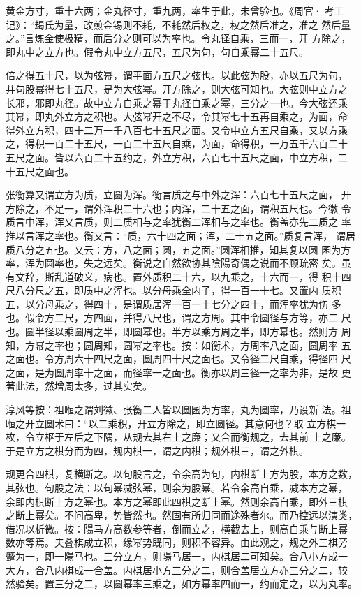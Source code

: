 \documentclass[a4paper,12pt,UTF8,twoside]{ctexbook}
\begin{document}
黄金方寸，重十六两；金丸径寸，重九两，率生于此，未曾验也。《周官· 考工记》：“朅氏为量，改煎金锡则不耗，不耗然后权之，权之然后准之，准之 然后量之。”言炼金使极精，而后分之则可以为率也。令丸径自乘，三而一，开 方除之，即丸中之立方也。假令丸中立方五尺，五尺为句，句自乘幂二十五尺。

倍之得五十尺，以为弦幂，谓平面方五尺之弦也。以此弦为股，亦以五尺为句， 并句股幂得七十五尺，是为大弦幂。开方除之，则大弦可知也。大弦则中立方之 长邪，邪即丸径。故中立方自乘之幂于丸径自乘之幂，三分之一也。今大弦还乘 其幂，即丸外立方之积也。大弦幂开之不尽，令其幂七十五再自乘之，为面，命 得外立方积，四十二万一千八百七十五尺之面。又令中立方五尺自乘，又以方乘 之，得积一百二十五尺，一百二十五尺自乘，为面，命得积，一万五千六百二十 五尺之面。皆以六百二十五约之，外立方积，六百七十五尺之面，中立方积，二 十五尺之面也。

张衡算又谓立方为质，立圆为浑。衡言质之与中外之浑：六百七十五尺之面， 开方除之，不足一，谓外浑积二十六也；内浑，二十五之面，谓积五尺也。今徽 令质言中浑，浑又言质，则二质相与之率犹衡二浑相与之率也。衡盖亦先二质之 率推以言浑之率也。衡又言：“质，六十四之面；浑，二十五之面。”质复言浑， 谓居质八分之五也。又云：方，八之面；圆，五之面。”圆浑相推，知其复以圆 囷为方率，浑为圆率也，失之远矣。衡说之自然欲协其陰陽奇偶之说而不顾疏密 矣。虽有文辞，斯乱道破义，病也。置外质积二十六，以九乘之，十六而一，得 积十四尺八分尺之五，即质中之浑也。以分母乘全内子，得一百一十七。又置内 质积五，以分母乘之，得四十，是谓质居浑一百一十七分之四十，而浑率犹为伤 多也。假令方二尺，方四面，并得八尺也，谓之方周。其中令圆径与方等，亦二 尺也。圆半径以乘圆周之半，即圆幂也。半方以乘方周之半，即方幂也。然则方 周知，方幂之率也；圆周知，圆幂之率也。按：如衡术，方周率八之面，圆周率 五之面也。令方周六十四尺之面，圆周四十尺之面也。又令径二尺自乘，得径四 尺之面，是为圆周率十之面，而径率一之面也。衡亦以周三径一之率为非，是故 更著此法，然增周太多，过其实矣。

淳风等按：祖暅之谓刘徽、张衡二人皆以圆囷为方率，丸为圆率，乃设新 法。祖暅之开立圆术曰：“以二乘积，开立方除之，即立圆径。其意何也？取 立方棋一枚，令立枢于左后之下隅，从规去其右上之廉；又合而衡规之，去其前 上之廉。于是立方之棋分而为四，规内棋一，谓之内棋；规外棋三，谓之外棋。

规更合四棋，复横断之。以句股言之，令余高为句，内棋断上方为股，本方之数， 其弦也。句股之法：以句幂减弦幂，则余为股幂。若令余高自乘，减本方之幂， 余即内棋断上方之幂也。本方之幂即此四棋之断上幂。然则余高自乘，即外三棋 之断上幂矣。不问高卑，势皆然也。然固有所归同而途殊者尔。而乃控远以演类， 借况以析微。按：陽马方高数参等者，倒而立之，横截去上，则高自乘与断上幂 数亦等焉。夫叠棋成立积，缘幂势既同，则积不容异。由此观之，规之外三棋旁 蹙为一，即一陽马也。三分立方，则陽马居一，内棋居二可知矣。合八小方成一 大方，合八内棋成一合盖。内棋居小方三分之二，则合盖居立方亦三分之二，较 然验矣。置三分之二，以圆幂率三乘之，如方幂率四而一，约而定之，以为丸率。
\end{document}
